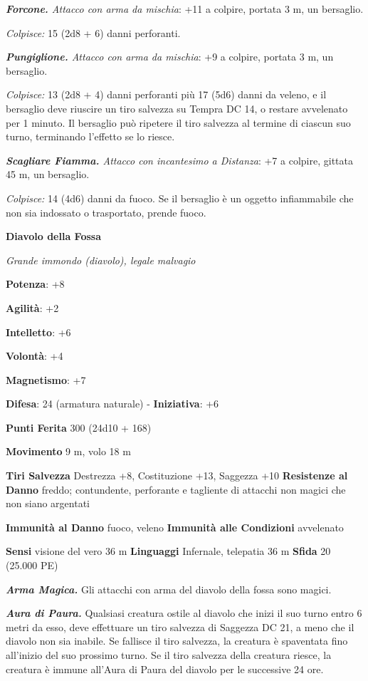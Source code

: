 \begin{multicols}{2}
\emph{\textbf{Forcone.} Attacco con arma da mischia}: +11 a colpire,
portata 3 m, un bersaglio.

\emph{Colpisce:} 15 (2d8 + 6) danni perforanti.

\emph{\textbf{Pungiglione.} Attacco con arma da mischia}: +9 a colpire,
portata 3 m, un bersaglio.

\emph{Colpisce:} 13 (2d8 + 4) danni perforanti più 17 (5d6) danni da
veleno, e il bersaglio deve riuscire un tiro salvezza su Tempra DC
14, o restare avvelenato per 1 minuto. Il bersaglio può ripetere il tiro
salvezza al termine di ciascun suo turno, terminando l'effetto se lo
riesce.

\emph{\textbf{Scagliare Fiamma.} Attacco con incantesimo a Distanza}: +7
a colpire, gittata 45 m, un bersaglio.

\emph{Colpisce:} 14 (4d6) danni da fuoco. Se il bersaglio è un oggetto
infiammabile che non sia indossato o trasportato, prende fuoco.

\textbf{Diavolo della Fossa}

\emph{Grande immondo (diavolo), legale malvagio}

\textbf{Potenza}: +8

\textbf{Agilità}: +2

\textbf{Intelletto}: +6

\textbf{Volontà}: +4

\textbf{Magnetismo}: +7

\textbf{Difesa}: 24 (armatura naturale) - \textbf{Iniziativa}: +6

\textbf{Punti Ferita} 300 (24d10 + 168)

\textbf{Movimento} 9 m, volo 18 m

\textbf{Tiri Salvezza} Destrezza +8, Costituzione +13, Saggezza +10
\textbf{Resistenze al Danno} freddo; contundente, perforante e tagliente
di attacchi non magici che non siano argentati

\textbf{Immunità al Danno} fuoco, veleno \textbf{Immunità alle
Condizioni} avvelenato

\textbf{Sensi} visione del vero 36 m
\textbf{Linguaggi} Infernale, telepatia 36 m \textbf{Sfida} 20 (25.000
PE)

\emph{\textbf{Arma Magica.}} Gli attacchi con arma del diavolo della
fossa sono magici.

\emph{\textbf{Aura di Paura.}} Qualsiasi creatura ostile al diavolo che
inizi il suo turno entro 6 metri da esso, deve effettuare un tiro
salvezza di Saggezza DC 21, a meno che il diavolo non sia inabile. Se
fallisce il tiro salvezza, la creatura è spaventata fino all'inizio del
suo prossimo turno. Se il tiro salvezza della creatura riesce, la
creatura è immune all'Aura di Paura del diavolo per le successive 24
ore.


\end{multicols}
